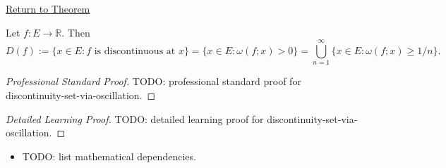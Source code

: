 \newpage
{}
\label{prf:discontinuity-set-via-oscillation}

\begin{remark*}[Return]
\hyperref[prop:discontinuity-set-via-oscillation]{Return to Theorem}
\end{remark*}

\begin{proposition*}
Let $f:E\to\mathbb{R}$. Then
\[
D(f):=\{x\in E: f \text{ is discontinuous at } x\}
=\{x\in E: \omega(f;x)>0\}
=\bigcup_{n=1}^{\infty} \{x\in E: \omega(f;x)\ge 1/n\}.
\]
\end{proposition*}

\begin{proof}[Professional Standard Proof]
\LRAProofBodyStart
TODO: professional standard proof for discontinuity-set-via-oscillation.
\end{proof}

\begin{proof}[Detailed Learning Proof]
\LRAProofBodyStart
TODO: detailed learning proof for discontinuity-set-via-oscillation.
\end{proof}

\begin{remark*}
\end{remark*}

\begin{dependencies}
\begin{itemize}
  \item TODO: list mathematical dependencies.
\end{itemize}
\end{dependencies}

\clearpage
